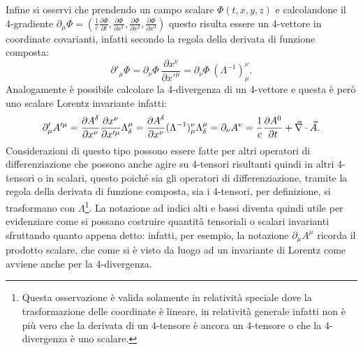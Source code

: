 Infine si osservi che prendendo un campo scalare $\Phi(t,x,y,z)$ e calcolandone il 4-gradiente $\partial_\mu\Phi=(\frac{1}{c}\frac{\partial\Phi}{\partial t},\frac{\partial\Phi}{\partial x^1},\frac{\partial\Phi}{\partial x^2},\frac{\partial\Phi}{\partial x^3})$ questo risulta essere un 4-vettore in coordinate covarianti, infatti secondo la regola della derivata di funzione composta:
\begin{equation*}
    \partial'_\mu\Phi=\partial_\nu\Phi\ \frac{\partial x^\nu}{\partial x'^\mu}=\partial_\nu\Phi\ (\Lambda^{-1})_\mu^\nu.
\end{equation*}
Analogamente è possibile calcolare la 4-divergenza di un 4-vettore e questa è però uno scalare Lorentz invariante infatti:
\begin{equation*}
    \partial'_\mu A'^\mu=\frac{\partial A^\delta}{\partial x^\nu} \frac{\partial x^\nu}{\partial x'^\mu}\Lambda^\mu_\delta=\frac{\partial A^\delta}{\partial x^\nu}(\Lambda^{-1})_\mu^\nu \Lambda^\mu_\delta=\partial_\nu A^\nu=\frac{1}{c}\frac{\partial A^0}{\partial t}+\vec{\nabla}\cdot \vec{A}.
\end{equation*} 
Considerazioni di questo tipo possono essere fatte per altri operatori di differenziazione che possono anche agire su 4-tensori risultanti quindi in altri 4-tensori o in scalari, questo poiché sia gli operatori di differenziazione, tramite la regola della derivata di funzione composta, sia i 4-tensori, per definizione, si trasformano con $\Lambda$\footnote{Questa osservazione è valida solamente in relatività speciale dove la trasformazione delle coordinate è lineare, in relatività generale infatti non è più vero che la derivata di un 4-tensore è ancora un 4-tensore o che la 4-divergenza è uno scalare.}. La notazione ad indici alti e bassi diventa quindi utile per evidenziare come si possano costruire quantità tensoriali o scalari invarianti sfruttando quanto appena detto: infatti, per esempio, la notazione $\partial_\mu A^\mu$ ricorda il prodotto scalare, che come si è visto da luogo ad un invariante di Lorentz come avviene anche per la 4-divergenza.\\
